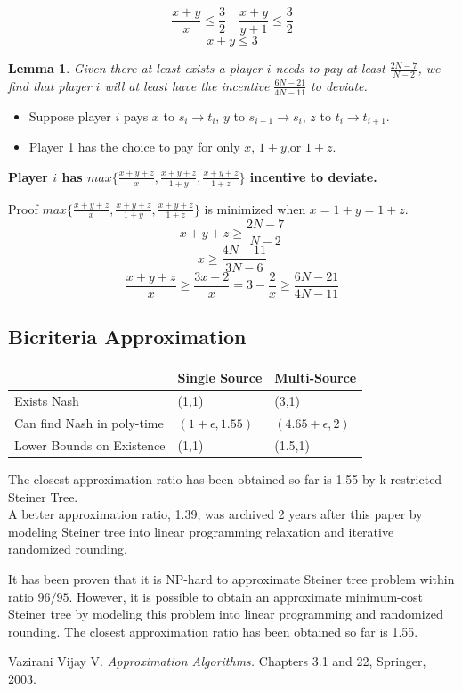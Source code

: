 \documentclass[11pt,psfig,times]{article}
\newtheorem{lemma}{Lemma}[section]
\begin{document}
		\[\frac{x+y}{x} \leq \frac{3}{2}\quad\frac{x+y}{y+1} \leq \frac{3}{2}\]
		 \[x+y\leq 3\]    
	
	
		\begin{lemma}
			Given there at least exists a player $i$ needs to pay at least $\frac{2N-7}{N-2}$, we find that player $i$ will at least have the incentive $\frac{6N-21}{4N-11}$ to deviate.
		\end{lemma}
		\begin{itemize}
			\item Suppose player $i$ pays $x$ to $s_i \rightarrow t_i$, $y$ to $s_{i-1} \rightarrow s_i$, $z$ to $t_i \rightarrow t_{i+1}$. 
			\item Player 1 has the choice to pay for only $x$, $1+y$,or $1+z$. 
		\end{itemize}
		
		\textbf{ Player $i$ has $max\{\frac{x+y+z}{x},\frac{x+y+z}{1+y},\frac{x+y+z}{1+z}\}$ incentive to deviate. }
	
	{Proof}
		$max\{\frac{x+y+z}{x},\frac{x+y+z}{1+y},\frac{x+y+z}{1+z}\}$ is minimized when $x = 1+y =1+z$. 
		\[x+y+z \geq \frac{2N-7}{N-2}\]
		\[x \geq \frac{4N-11}{3N-6}\]
		\[\frac{x+y+z}{x} \geq \frac{3x-2}{x} = 3-\frac{2}{x} \geq \frac{6N-21}{4N-11} \]
	
	
	\subsection{Bicriteria Approximation}
	\begin{center}
			\begin{tabular} { 
				| m{5cm} | m{3cm}| m{3cm} | }
			   \hline
				& Single Source & Multi-Source\\
			   \hline
			   Exists Nash  & (1,1)  &  (3,1)\\
			  \hline
			  Can find Nash in poly-time & $(1+\epsilon,1.55)$ & $(4.65+\epsilon,2)$\\
			  \hline
			  Lower Bounds on Existence & (1,1) & (1.5,1)\\
			  \hline
			  \end{tabular}
	\end{center}

		  
		The closest approximation ratio has been obtained so far is 1.55 by k-restricted Steiner Tree.\\
		A better approximation ratio, 1.39, was archived 2 years after this paper by modeling Steiner tree into linear programming relaxation and iterative randomized rounding.
	
	

It has been proven that it is NP-hard to approximate Steiner tree problem within ratio \(96/95\). However, it is possible to obtain an approximate minimum-cost Steiner tree by modeling this problem into linear programming and randomized rounding. The closest approximation ratio has been obtained so far is 1.55.

\begin{thebibliography}{10}
	\setlength{\itemsep}{0pt plus .3pt}
	\setlength{\parsep}{0pt plus .3pt}
	\setlength{\parskip}{0pt plus .3pt}
Vazirani Vijay V. {\em Approximation Algorithms.\/} Chapters 3.1 and 22, Springer, 2003.
\end{thebibliography}
\end{document}
